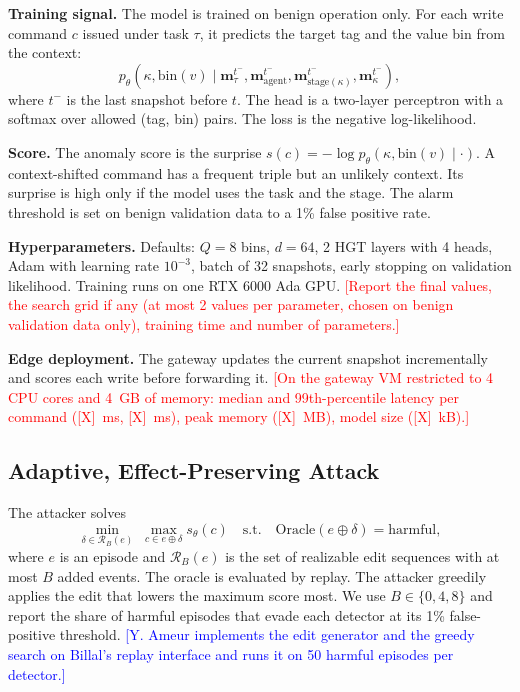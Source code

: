 \documentclass[journal]{IEEEtran}
\newcommand{\billal}[1]{\textcolor{red}{#1}}
\newcommand{\yulliwas}[1]{\textcolor{blue}{#1}}
\begin{document}
\textbf{Training signal.} The model is trained on benign operation only. For each write command $c$ issued under task $\tau$, it predicts the target tag and the value bin from the context:
\begin{equation}
p_\theta(\kappa,\mathrm{bin}(v)\mid \mathbf{m}_{\tau}^{t^-},\mathbf{m}_{\text{agent}}^{t^-},\mathbf{m}_{\text{stage}(\kappa)}^{t^-},\mathbf{m}_{\kappa}^{t^-}),
\end{equation}
where $t^-$ is the last snapshot before $t$. The head is a two-layer perceptron with a softmax over allowed (tag, bin) pairs. The loss is the negative log-likelihood.

\textbf{Score.} The anomaly score is the surprise $s(c)=-\log p_\theta(\kappa,\mathrm{bin}(v)\mid\cdot)$. A context-shifted command has a frequent triple but an unlikely context. Its surprise is high only if the model uses the task and the stage. The alarm threshold is set on benign validation data to a 1\% false positive rate.

\textbf{Hyperparameters.} Defaults: $Q=8$ bins, $d=64$, 2 HGT layers with 4 heads, Adam with learning rate $10^{-3}$, batch of 32 snapshots, early stopping on validation likelihood. Training runs on one RTX 6000 Ada GPU. \billal{[Report the final values, the search grid if any (at most 2 values per parameter, chosen on benign validation data only), training time and number of parameters.]}

\textbf{Edge deployment.} The gateway updates the current snapshot incrementally and scores each write before forwarding it. \billal{[On the gateway VM restricted to 4 CPU cores and 4~GB of memory: median and 99th-percentile latency per command ([X]~ms, [X]~ms), peak memory ([X]~MB), model size ([X]~kB).]}

\subsection{Adaptive, Effect-Preserving Attack}\label{sec:adv}
The attacker solves
\begin{equation}
\min_{\delta\in\mathcal{R}_B(e)}\; \max_{c\in e\oplus\delta} s_\theta(c)\quad\text{s.t.}\quad \mathrm{Oracle}(e\oplus\delta)=\text{harmful},
\end{equation}
where $e$ is an episode and $\mathcal{R}_B(e)$ is the set of realizable edit sequences with at most $B$ added events. The oracle is evaluated by replay. The attacker greedily applies the edit that lowers the maximum score most. We use $B\in\{0,4,8\}$ and report the share of harmful episodes that evade each detector at its 1\% false-positive threshold. \yulliwas{[Y. Ameur implements the edit generator and the greedy search on Billal's replay interface and runs it on 50 harmful episodes per detector.]}
\end{document}
